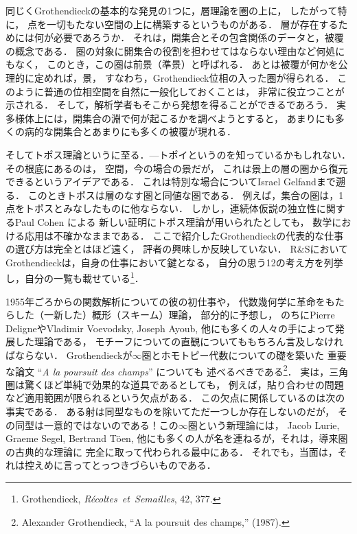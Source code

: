 \documentclass[11pt, a4paper, dvipdfmx]{jlreq}
\theoremstyle{definition}
\theoremstyle{mystyle}
\numberwithin{equation}{section} %
\begin{document}
同じくGrothendieckの基本的な発見の1つに，層理論を圏の上に，
したがって特に，
点を一切もたない空間の上に構築するというものがある．
層が存在するためには何が必要であろうか．
それは，開集合とその包含関係のデータと，被覆の概念である．
圏の対象に開集合の役割を担わせてはならない理由など何処にもなく，
このとき，この圏は前景（準景）と呼ばれる．
あとは被覆が何かを公理的に定めれば，景，
すなわち，Grothendieck位相の入った圏が得られる．
このように普通の位相空間を自然に一般化しておくことは，
非常に役立つことが示される．
そして，解析学者もそこから発想を得ることができるであろう．
実多様体上には，開集合の淵で何が起こるかを調べようとすると，
あまりにも多くの病的な開集合とあまりにも多くの被覆が現れる．

そしてトポス理論というに至る．---トポイというのを知っているかもしれない．
その根底にあるのは，
空間，今の場合の景だが，
これは景上の層の圏から復元できるというアイデアである．
これは特別な場合についてIsrael Gelfandまで遡る．
このときトポスは層のなす圏と同値な圏である．
例えば，集合の圏は，1点をトポスとみなしたものに他ならない．
しかし，連続体仮説の独立性に関するPaul Cohen による
新しい証明にトポス理論が用いられたとしても，
数学における応用は不確かなままである．
ここで紹介したGrothendieckの代表的な仕事の選び方は完全とはほど遠く，
評者の興味しか反映していない．
R\&SにおいてGrothendieckは，自身の仕事において鍵となる，
自分の思う12の考え方を列挙し，自分の一覧も載せている\footnote[12]{
    Grothendieck,
    \textit{R\'ecoltes\ et\ Semailles}, 42, 377.
}．

1955年ごろからの関数解析についての彼の初仕事や，
代数幾何学に革命をもたらした（一新した）概形（スキーム）理論，
部分的に予想し，
のちにPierre DeligneやVladimir Voevodsky, Joseph Ayoub, 
他にも多くの人々の手によって発展した理論である，
モチーフについての直観についてももちろん言及しなければならない．
Grothendieckが$\infty$圏とホモトピー代数についての礎を築いた
重要な論文 ``\textit{A la poursuit des champs}'' についても
述べるべきである\footnote[13]{
    Alexander Grothendieck, ``A la poursuit des champs,'' (1987).
}．
実は，三角圏は驚くほど単純で効果的な道具であるとしても，
例えば，貼り合わせの問題など適用範囲が限られるという欠点がある．
この欠点に関係しているのは次の事実である．
ある射は同型なものを除いてただ一つしか存在しないのだが，
その同型は一意的ではないのである！この$\infty$圏という新理論には，
Jacob Lurie, Graeme Segel, Bertrand T\"oen, 
他にも多くの人が名を連ねるが，それは，導来圏の古典的な理論に
完全に取って代わられる最中にある．
それでも，当面は，それは控えめに言ってとっつきづらいものである．



%
%
\end{document}
